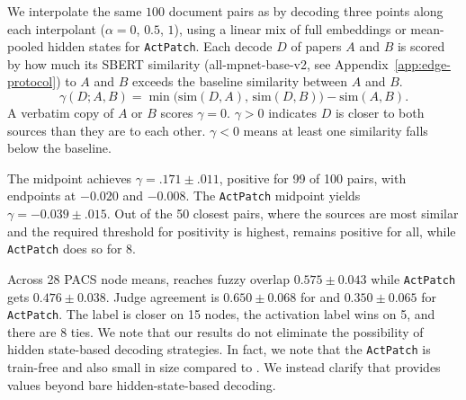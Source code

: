 We interpolate the same $100$ document pairs as  by decoding three points along each interpolant ($\alpha=0$, $0.5$, $1$), using a linear mix of full \doctolora embeddings or mean-pooled hidden states for \texttt{ActPatch}.
Each decode $D$ of papers $A$ and $B$ is scored by how much its SBERT similarity (all-mpnet-base-v2, see Appendix~\ref{app:edge-protocol}) to $A$ and $B$ exceeds the baseline similarity between $A$ and $B$.
\begin{equation}
\gamma(D;A,B)=\min\bigl(\mathrm{sim}(D,A),\,\mathrm{sim}(D,B)\bigr)-\mathrm{sim}(A,B).
\label{eq:midpoint-gain}
\end{equation}
A verbatim copy of $A$ or $B$ scores $\gamma=0$.
$\gamma>0$ indicates $D$ is closer to both sources than they are to each other.
$\gamma<0$ means at least one similarity falls below the baseline.

The \doctolora midpoint achieves $\gamma = .171 \pm .011$, positive for 99 of 100 pairs, with endpoints at $-0.020$ and $-0.008$.
The \texttt{ActPatch} midpoint yields $\gamma = -0.039 \pm .015$.
Out of the 50 closest pairs, where the sources are most similar and the required threshold for positivity is highest, \doctolora remains positive for all, while \texttt{ActPatch} does so for 8.

Across 28 PACS node means, \doctolora reaches fuzzy overlap $0.575 \pm 0.043$ while \texttt{ActPatch} gets $0.476 \pm 0.038$. Judge agreement is $0.650 \pm 0.068$ for \doctolora and $0.350 \pm 0.065$ for \texttt{ActPatch}. The \doctolora label is closer on 15 nodes, the activation label wins on 5, and there are 8 ties. 
We note that our results do not eliminate the possibility of hidden state-based decoding strategies.
In fact, we note that the \texttt{ActPatch} is train-free and also small in size compared to \doctolora. 
We instead clarify that \doctolora provides values beyond bare hidden-state-based decoding. 